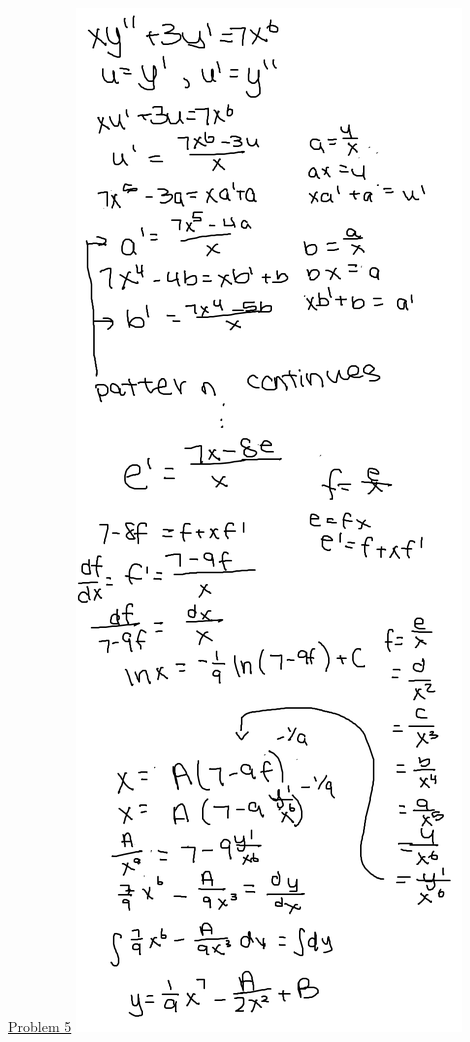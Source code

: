 \documentclass{article}
\begin{document}
\underline{Problem 5}\newline{}
\includegraphics[width=\textwidth,height=\textheight,keepaspectratio]{ams361q25.png}\clearpage{}
\end{document}
